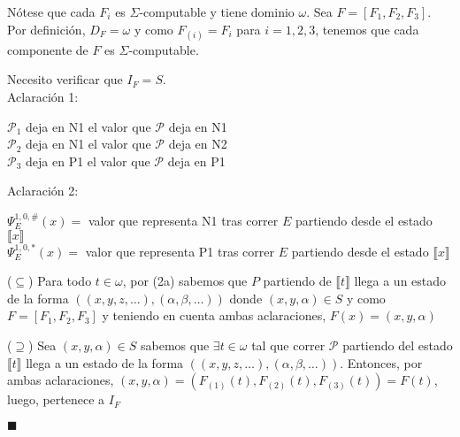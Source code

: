 \documentclass{article}
\begin{document}
Nótese que cada $F_i$ es $\Sigma$-computable y tiene dominio $\omega$. Sea $F = [F_1, F_2, F_3]$. Por definición, $D_F = \omega$ y como $F_{(i)} = F_i$ para $i = 1, 2, 3$, tenemos que cada componente de $F$ es $\Sigma$-computable.

Necesito verificar que $I_F = S$. \\
Aclaración 1: 
\begin{center}
    $\mathcal{P}_1$ deja en N1 el valor que $\mathcal{P}$ deja en N1\\
    $\mathcal{P}_2$ deja en N1 el valor que $\mathcal{P}$ deja en N2\\
    $\mathcal{P}_3$ deja en P1 el valor que $\mathcal{P}$ deja en P1\\
\end{center}
Aclaración 2:
\begin{center}
    $\Psi_E^{1, 0, \#}(x) = $ valor que representa N1 tras correr $E$ partiendo desde el estado $\llbracket x \rrbracket$\\
    $\Psi_E^{1, 0, *}(x) = $ valor que representa P1 tras correr $E$ partiendo desde el estado $\llbracket x \rrbracket$\\  
\end{center}
\bigskip

($\subseteq$) Para todo $t \in \omega$, por (2a) sabemos que $P$ partiendo de $\llbracket t \rrbracket$ llega a un estado de la forma $((x, y, z, \dots), (\alpha, \beta, \dots))$ donde $(x, y, \alpha) \in S$ y como $F = [F_1, F_2, F_3]$ y teniendo en cuenta ambas aclaraciones, $F(x) = (x, y, \alpha)$\\
\medskip

($\supseteq$) Sea $(x, y, \alpha) \in S$ sabemos que $\exists t \in \omega$ tal que correr $\mathcal{P}$ partiendo del estado $\llbracket t \rrbracket$ llega a un estado de la forma $((x, y, z, \dots), (\alpha, \beta, \dots))$. Entonces, por ambas aclaraciones, $(x, y, \alpha) = (F_{(1)}(t), F_{(2)}(t), F_{(3)}(t)) = F(t)$, luego, pertenece a $I_F$

\hfill $\blacksquare$
\end{document}
